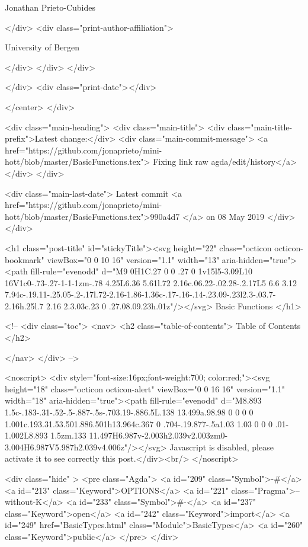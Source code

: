                   Jonathan Prieto-Cubides
                
              </div>
              <div class="print-author-affiliation">
                
                  University of Bergen
                
                </div>
            </div>
          </div>
          
          
        </div>
        <div class="print-date"></div>
        
        
    </center>
  </div>

  
  <div class="main-heading">
    <div class="main-title">
      <div class="main-title-prefix">Latest change:</div>
      <div class="main-commit-message">
            <a href="https://github.com/jonaprieto/mini-hott/blob/master/BasicFunctions.tex">
              Fixing link raw agda/edit/history</a>
      </div>
    </div>

    <div class="main-last-date">
      Latest commit <a href="https://github.com/jonaprieto/mini-hott/blob/master/BasicFunctions.tex">990a4d7 </a> on  08 May 2019
    </div>
  </div>
  
  <h1 class="post-title" id="stickyTitle"><svg height="22" class="octicon octicon-bookmark" viewBox="0 0 10 16" version="1.1" width="13" aria-hidden="true"><path fill-rule="evenodd" d="M9 0H1C.27 0 0 .27 0 1v15l5-3.09L10 16V1c0-.73-.27-1-1-1zm-.78 4.25L6.36 5.61l.72 2.16c.06.22-.02.28-.2.17L5 6.6 3.12 7.94c-.19.11-.25.05-.2-.17l.72-2.16-1.86-1.36c-.17-.16-.14-.23.09-.23l2.3-.03.7-2.16h.25l.7 2.16 2.3.03c.23 0 .27.08.09.23h.01z"/></svg> Basic Functions
  </h1>

  <!-- 
  <div class="toc">
    <nav>
    <h2 class="table-of-contents"> Table of Contents </h2>
      

    </nav>
  </div>
   -->

  <noscript>
  <div style="font-size:16px;font-weight:700; color:red;"><svg height="18" class="octicon octicon-alert" viewBox="0 0 16 16" version="1.1" width="18" aria-hidden="true"><path fill-rule="evenodd" d="M8.893 1.5c-.183-.31-.52-.5-.887-.5s-.703.19-.886.5L.138 13.499a.98.98 0 0 0 0 1.001c.193.31.53.501.886.501h13.964c.367 0 .704-.19.877-.5a1.03 1.03 0 0 0 .01-1.002L8.893 1.5zm.133 11.497H6.987v-2.003h2.039v2.003zm0-3.004H6.987V5.987h2.039v4.006z"/></svg> Javascript is disabled, please activate it to see correctly this post.</div><br/>
  </noscript>

  <div class="hide" >
<pre class="Agda">
<a id="209" class="Symbol">{-#</a> <a id="213" class="Keyword">OPTIONS</a> <a id="221" class="Pragma">--without-K</a> <a id="233" class="Symbol">#-}</a>
<a id="237" class="Keyword">open</a> <a id="242" class="Keyword">import</a> <a id="249" href="BasicTypes.html" class="Module">BasicTypes</a> <a id="260" class="Keyword">public</a>
</pre>
</div>

